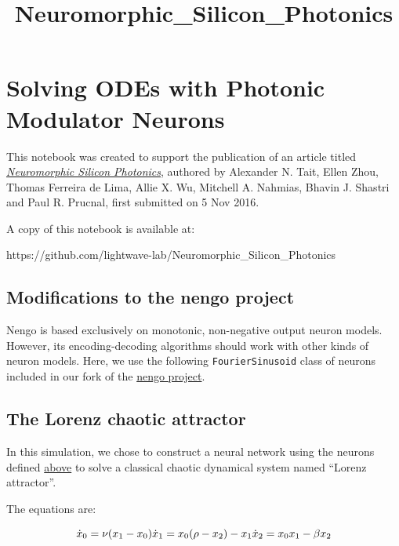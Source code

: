 \documentclass{report}
\title{Neuromorphic\_Silicon\_Photonics}
\begin{document}
    \maketitle


    \tableofcontents



\chapter{Solving ODEs with Photonic Modulator
Neurons}\label{solving-odes-with-photonic-modulator-neurons}

This notebook was created to support the publication of an article
titled \href{https://arxiv.org/abs/1611.02272}{\emph{Neuromorphic
Silicon Photonics}}, authored by Alexander N. Tait, Ellen Zhou, Thomas
Ferreira de Lima, Allie X. Wu, Mitchell A. Nahmias, Bhavin J. Shastri
and Paul R. Prucnal, first submitted on 5 Nov 2016.

A copy of this notebook is available at:

https://github.com/lightwave-lab/Neuromorphic\_Silicon\_Photonics


\section{Modifications to the nengo
project}\label{modifications-to-the-nengo-project}

Nengo is based exclusively on monotonic, non-negative output neuron
models. However, its encoding-decoding algorithms should work with other
kinds of neuron models. Here, we use the following
\texttt{FourierSinusoid} class of neurons included in our fork of the
\href{https://github.com/nengo/nengo/}{nengo project}.


\section{The Lorenz chaotic
attractor}\label{the-lorenz-chaotic-attractor}

In this simulation, we chose to construct a neural network using the
neurons defined \protect\hyperlink{fourier_neuron_nengo}{above} to solve
a classical chaotic dynamical system named ``Lorenz attractor''.

The equations are:

\[
\dot{x}_0 = \nu(x_1 - x_0) \\
\dot{x}_1 = x_0 (\rho - x_2) - x_1  \\
\dot{x}_2 = x_0 x_1 - \beta x_2
\]
\end{document}
